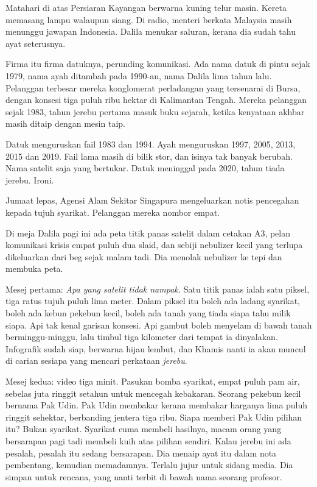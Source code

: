 \documentclass[
  11pt,
  a5paper,
  openany,
  oneside]{book}
\begin{document}
Matahari di atas Persiaran Kayangan berwarna kuning telur masin. Kereta
memasang lampu walaupun siang. Di radio, menteri berkata Malaysia masih
menunggu jawapan Indonesia. Dalila menukar saluran, kerana dia sudah
tahu ayat seterusnya.

Firma itu firma datuknya, perunding komunikasi. Ada nama datuk di pintu
sejak 1979, nama ayah ditambah pada 1990-an, nama Dalila lima tahun
lalu. Pelanggan terbesar mereka konglomerat perladangan yang tersenarai
di Bursa, dengan konsesi tiga puluh ribu hektar di Kalimantan Tengah.
Mereka pelanggan sejak 1983, tahun jerebu pertama masuk buku sejarah,
ketika kenyataan akhbar masih ditaip dengan mesin taip.

Datuk menguruskan fail 1983 dan 1994. Ayah menguruskan 1997, 2005, 2013,
2015 dan 2019. Fail lama masih di bilik stor, dan isinya tak banyak
berubah. Nama satelit saja yang bertukar. Datuk meninggal pada 2020,
tahun tiada jerebu. Ironi.

Jumaat lepas, Agensi Alam Sekitar Singapura mengeluarkan notis
pencegahan kepada tujuh syarikat. Pelanggan mereka nombor empat.

Di meja Dalila pagi ini ada peta titik panas satelit dalam cetakan A3,
pelan komunikasi krisis empat puluh dua slaid, dan sebiji nebulizer
kecil yang terlupa dikeluarkan dari beg sejak malam tadi. Dia menolak
nebulizer ke tepi dan membuka peta.

Mesej pertama: \emph{Apa yang satelit tidak nampak.} Satu titik panas
ialah satu piksel, tiga ratus tujuh puluh lima meter. Dalam piksel itu
boleh ada ladang syarikat, boleh ada kebun pekebun kecil, boleh ada
tanah yang tiada siapa tahu milik siapa. Api tak kenal garisan konsesi.
Api gambut boleh menyelam di bawah tanah berminggu-minggu, lalu timbul
tiga kilometer dari tempat ia dinyalakan. Infografik sudah siap,
berwarna hijau lembut, dan Khamis nanti ia akan muncul di carian sesiapa
yang mencari perkataan \emph{jerebu}.

Mesej kedua: video tiga minit. Pasukan bomba syarikat, empat puluh pam
air, sebelas juta ringgit setahun untuk mencegah kebakaran. Seorang
pekebun kecil bernama Pak Udin. Pak Udin membakar kerana membakar
harganya lima puluh ringgit sehektar, berbanding jentera tiga ribu.
Siapa memberi Pak Udin pilihan itu? Bukan syarikat. Syarikat cuma
membeli hasilnya, macam orang yang bersarapan pagi tadi membeli kuih
atas pilihan sendiri. Kalau jerebu ini ada pesalah, pesalah itu sedang
bersarapan. Dia menaip ayat itu dalam nota pembentang, kemudian
memadamnya. Terlalu jujur untuk sidang media. Dia simpan untuk rencana,
yang nanti terbit di bawah nama seorang profesor.
\end{document}

